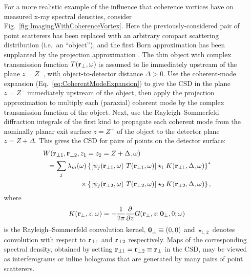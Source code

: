 \documentclass[%
 reprint,
 amsmath,amssymb,
 aps,
]{revtex4-1}
\begin{document}
For a more realistic example of the influence that coherence vortices have on measured x-ray spectral densities, consider {Fig.~\ref{fig:ImagingWithCoherenceVortex}}.  Here the previously-considered pair of point scatterers has been replaced with an arbitrary compact scattering distribution (i.e.~an ``object''), and the first Born approximation has been supplanted by the projection approximation \cite{paganin_book}.  The thin object  with complex transmission function $T({\bf r}_{\perp},\omega)$ is assumed to lie immediately upstream of the plane $z=Z^-$, with  object-to-detector distance $\Delta > 0$.  Use the coherent-mode expansion (Eq.~\ref{eq:CoherentModeExpansion}) to give the CSD in the plane $z=Z^-$ immediately upstream of the object, then apply the projection approximation to multiply each (paraxial) coherent mode by the complex transmission function of the object.  Next, use the Rayleigh--Sommerfeld diffraction integrals of the first kind \cite{Rayleigh, Sommerfeld, mandel_wolf} to propagate each coherent mode from the nominally planar exit surface $z=Z^+$ of the object to the detector plane $z=Z+\Delta$.  This gives the CSD for pairs of points on the detector surface:     
\begin{equation}
\begin{aligned}
\label{eq:CSD_with_object_and_detector}
W ({\bf r}_{\perp 1}, {\bf r}_{\perp 2},z_1 &=z_2=Z+\Delta,\omega) \\ =\sum_j \lambda_m({\omega}) & \left\{ [\psi_j({\bf r}_{\perp 1},\omega)~T({\bf r}_{\perp 1},\omega)]\star_1 K({\bf r}_{\perp 1},\Delta,\omega)\right\}^* \\ \times & \left\{ [\psi_j({\bf r}_{\perp 2},\omega)~T({\bf r}_{\perp 2},\omega)]\star_2 K({\bf r}_{\perp 2},\Delta,\omega)\right\},
\end{aligned}
\end{equation}
where 
\begin{equation}
K({\bf r}_{\perp},z,\omega)=-\frac{1}{2\pi} \frac{\partial}{\partial z} G({\bf r}_{\perp},z;{\bf 0}_{\perp},0;\omega) 
\end{equation}
is the Rayleigh--Sommerfeld convolution kernel, ${\bf 0}_{\perp}\equiv (0,0)$ and $\star_{1,2}$ denotes convolution with respect to ${\bf r}_{\perp 1}$ and ${\bf r}_{\perp 2}$ respectively.  Maps of the corresponding spectral density, obtained by setting ${\bf r}_{\perp 1}={\bf r}_{\perp 2}\equiv{\bf r}_{\perp}$ in the CSD, may be viewed as interferograms or inline holograms that are generated by many pairs of point scatterers.   
\end{document}

